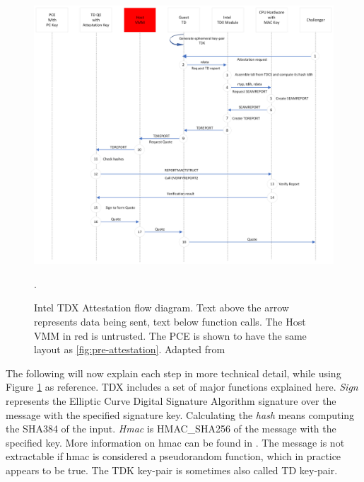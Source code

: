 \begin{figure}
\centering
\includegraphics[width=\textwidth]{figures/Attestation Diagram.png}
\caption{Intel TDX Attestation flow diagram. Text above the arrow represents data being sent, text below function calls. The Host VMM in red is untrusted. The PCE is shown to have the same layout as \cref{fig:pre-attestation}. Adapted from \cite{sardar_demystifying_2021}}.
\label{fig:QuoteGeneration}
\end{figure}
The following will now explain each step in more technical detail, while using Figure \ref{fig:QuoteGeneration} as reference. 
TDX includes a set of major functions explained here. \textit{Sign} represents the Elliptic Curve Digital Signature Algorithm signature over the message with the specified signature key. 
Calculating the \textit{hash} means computing the SHA384 of the input. \textit{Hmac} is HMAC\_SHA256 of the message with the specified key. More information on hmac can be found in \cite{hmac_keying_1996}. The message is not extractable if hmac is considered a pseudorandom function, which in practice appears to be true\cite{bellare_new_2006}. The TDK key-pair is sometimes also called TD key-pair.
\newcommand\setItemnumber[1]{\setcounter{enumi}{\numexpr#1-1\relax}}
